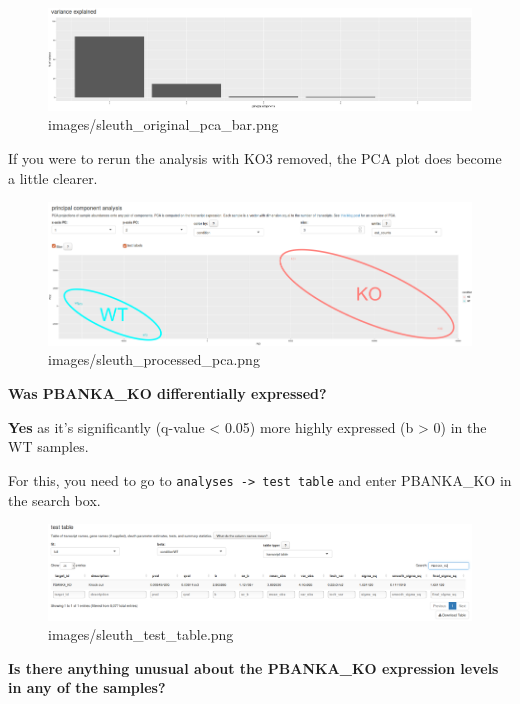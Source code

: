 \documentclass[11pt]{article}
\makeatletter
\def\maxwidth{\ifdim\Gin@nat@width>\linewidth\linewidth
    \else\Gin@nat@width\fi}
\let\Oldincludegraphics\includegraphics
\renewcommand{\includegraphics}[1]{\Oldincludegraphics[width=.8\maxwidth, height=.55\textheight, keepaspectratio]{#1}}
\makeatother
\begin{document}
    \begin{figure}[!h]
\centering
\includegraphics{images/sleuth_original_pca_bar.png}
\caption{images/sleuth\_original\_pca\_bar.png}
\end{figure}

    If you were to rerun the analysis with KO3 removed, the PCA plot does
become a little clearer.

    \begin{figure}[!h]
\centering
\includegraphics{images/sleuth_processed_pca.png}
\caption{images/sleuth\_processed\_pca.png}
\end{figure}

    \textbf{Was PBANKA\_KO differentially expressed?}

\textbf{Yes} as it's significantly (q-value \textless{} 0.05) more
highly expressed (b \textgreater{} 0) in the WT samples.

For this, you need to go to
\texttt{analyses\ -\textgreater{}\ test\ table} and enter PBANKA\_KO in
the search box.

    \begin{figure}[!h]
\centering
\includegraphics{images/sleuth_test_table.png}
\caption{images/sleuth\_test\_table.png}
\end{figure}

    \textbf{Is there anything unusual about the PBANKA\_KO expression levels
in any of the samples?}
\end{document}
